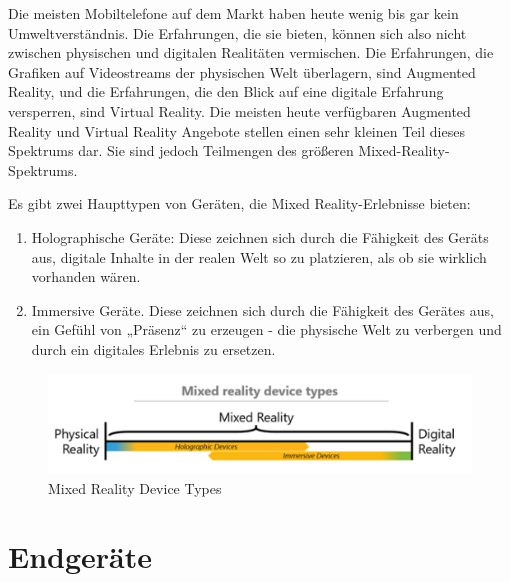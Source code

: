 Die meisten Mobiltelefone auf dem Markt haben heute wenig bis gar kein Umweltverständnis. Die Erfahrungen, die sie bieten, können sich also nicht zwischen physischen und digitalen Realitäten vermischen. Die Erfahrungen, die Grafiken auf Videostreams der physischen Welt überlagern, sind Augmented Reality, und die Erfahrungen, die den Blick auf eine digitale Erfahrung versperren, sind Virtual Reality. Die meisten heute verfügbaren Augmented Reality und Virtual Reality Angebote stellen einen sehr kleinen Teil dieses Spektrums dar. Sie sind jedoch Teilmengen des größeren Mixed-Reality-Spektrums. \newline 

\noindent Es gibt zwei Haupttypen von Geräten, die Mixed Reality-Erlebnisse bieten:
\begin{enumerate}[leftmargin=*,label= \arabic*:]
	 \item Holographische Geräte: Diese zeichnen sich durch die Fähigkeit des Geräts aus, digitale Inhalte in der realen Welt so zu platzieren, als ob sie wirklich vorhanden wären. 
	  \item Immersive Geräte. Diese zeichnen sich durch die Fähigkeit des Gerätes aus, ein Gefühl von „Präsenz“ zu erzeugen - die physische Welt zu verbergen und durch ein digitales Erlebnis zu ersetzen.
\end{enumerate}

\begin{figure}[ht]
	\centering
	\includegraphics[width=\textwidth,height=\textheight,keepaspectratio]{images/Mixed Reality Device Types.png}
	\caption{Mixed Reality Device Types}
	\label{Mixed-Reality2}
\end{figure}

\section{Endgeräte}

